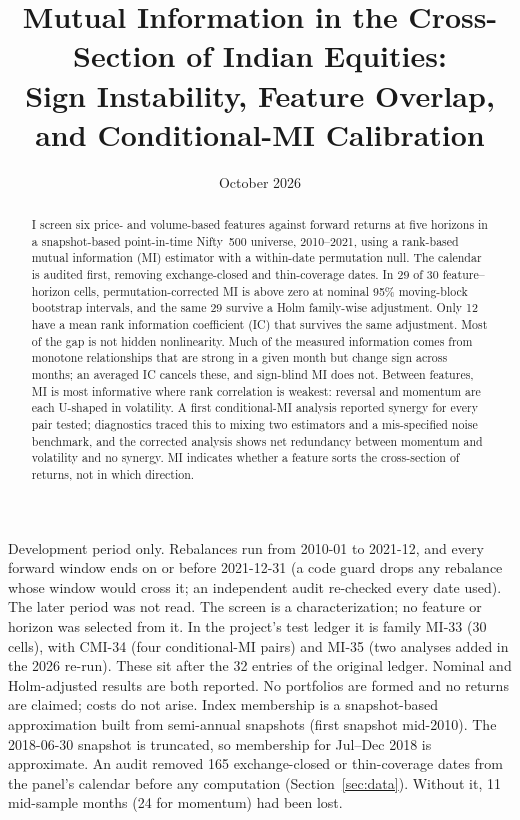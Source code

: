 \documentclass[11pt]{article}
\title{\textbf{Mutual Information in the Cross-Section of Indian Equities:\\
Sign Instability, Feature Overlap, and Conditional-MI Calibration}}
\author{\authorline}
\date{October 2026}
\begin{document}
\maketitle

\begin{abstract}
\noindent
I screen six price- and volume-based features against forward returns at five
horizons in a snapshot-based point-in-time Nifty~500 universe, 2010--2021, using a
rank-based mutual information (MI) estimator with a within-date permutation null.
The calendar is audited first, removing exchange-closed and thin-coverage dates.
In 29 of 30 feature--horizon cells, permutation-corrected MI is above zero at nominal
95\% moving-block bootstrap intervals, and the same 29 survive a Holm family-wise
adjustment. Only 12 have a mean rank information coefficient (IC) that survives the
same adjustment. Most of the gap is not hidden nonlinearity. Much of the measured
information comes from monotone relationships that are strong in a given month but
change sign across months; an averaged IC cancels these, and sign-blind MI does not.
Between features, MI is most informative where rank correlation is weakest: reversal
and momentum are each U-shaped in volatility. A first conditional-MI analysis
reported synergy for every pair tested; diagnostics traced this to mixing two
estimators and a mis-specified noise benchmark, and the corrected analysis shows net
redundancy between momentum and volatility and no synergy. MI indicates whether a
feature sorts the cross-section of returns, not in which direction.
\end{abstract}

\caveatsbox
{Development period only. Rebalances run from 2010-01 to 2021-12, and every forward window ends on or before 2021-12-31 (a code guard drops any rebalance whose window would cross it; an independent audit re-checked every date used). The later period was not read.}
{The screen is a characterization; no feature or horizon was selected from it. In the project's test ledger it is family MI-33 (30 cells), with CMI-34 (four conditional-MI pairs) and MI-35 (two analyses added in the 2026 re-run). These sit after the 32 entries of the original ledger. Nominal and Holm-adjusted results are both reported.}
{No portfolios are formed and no returns are claimed; costs do not arise.}
{Index membership is a snapshot-based approximation built from semi-annual snapshots (first snapshot mid-2010). The 2018-06-30 snapshot is truncated, so membership for Jul--Dec 2018 is approximate.}
{An audit removed 165 exchange-closed or thin-coverage dates from the panel's calendar before any computation (Section~\ref{sec:data}). Without it, 11 mid-sample months (24 for momentum) had been lost.}
\end{document}
